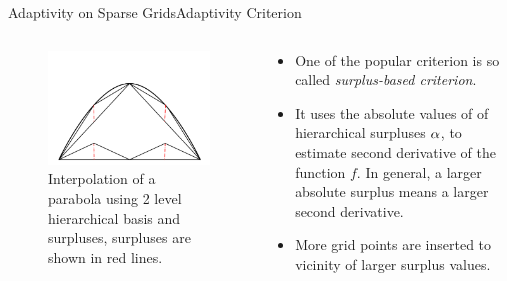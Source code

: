 \begin{frame}{Adaptivity on Sparse Grids}{Adaptivity Criterion}

    \begin{columns}
        \begin{column}{0.5\textwidth}
            \begin{figure}
                \centering
                \includegraphics[width=\textwidth,height=0.5\textheight,keepaspectratio]{figures/surplus_interpolation.pdf}
                \caption{Interpolation of a parabola using 2 level hierarchical basis and surpluses, surpluses are shown in red lines.}
            \end{figure}
        \end{column}
        \begin{column}{0.5\textwidth}
            \begin{itemize}[<+->]
                \item One of the popular criterion is so called \emph{surplus-based criterion}.
                \item  It uses the absolute values of of hierarchical surpluses \(\vb{\alpha}\), to estimate second derivative of the function \(f\). In general, a larger absolute surplus means a larger second derivative.
                \item  More grid points are inserted to vicinity of larger surplus values.
            \end{itemize}
        \end{column}
    \end{columns}

\end{frame}

